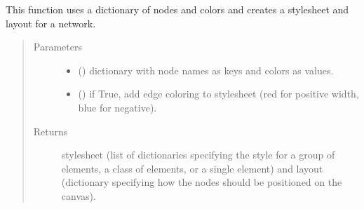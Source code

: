\documentclass[letterpaper,10pt,english]{sphinxmanual}
\begin{document}

\begin{fulllineitems}
\label{\detokenize{_autosummary/analytics_core.viz:analytics_core.viz.viz.get_network_style}}
This function uses a dictionary of nodes and colors and creates a stylesheet and layout for a network.
\begin{quote}\begin{description}
\item[{Parameters}] \leavevmode\begin{itemize}
\item {} 
 () \textendash{} dictionary with node names as keys and colors as values.

\item {} 
 () \textendash{} if True, add edge coloring to stylesheet (red for positive width, blue for negative).

\end{itemize}

\item[{Returns}] \leavevmode
stylesheet (list of dictionaries specifying the style for a group of elements, a class of elements, or a single element) and                 layout (dictionary specifying how the nodes should be positioned on the canvas).

\end{description}\end{quote}

\end{fulllineitems}

\end{document}

